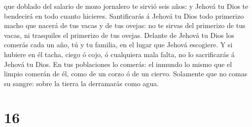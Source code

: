 que doblado del salario de mozo jornalero te sirvió seis años: y Jehová
tu Dios te bendecirá en todo cuanto hicieres.  Santificarás
á Jehová tu Dios todo primerizo macho que nacerá de tus vacas y de tus
ovejas: no te sirvas del primerizo de tus vacas, ni trasquiles el
primerizo de tus ovejas.  Delante de Jehová tu Dios los
comerás cada un año, tú y tu familia, en el lugar que Jehová escogiere.
 Y si hubiere en él tacha, ciego ó cojo, ó cualquiera mala
falta, no lo sacrificarás á Jehová tu Dios.  En tus
poblaciones lo comerás: el inmundo lo mismo que el limpio comerán de él,
como de un corzo ó de un ciervo.  Solamente que no comas su
sangre: sobre la tierra la derramarás como agua.

\hypertarget{section-15}{%
\section{16}\label{section-15}}

